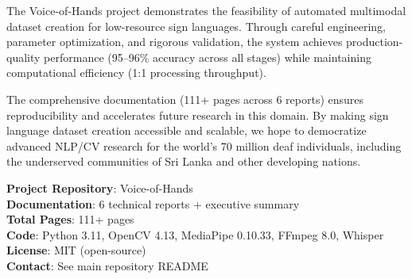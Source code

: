 \documentclass[11pt,a4paper]{article}
\begin{document}
The Voice-of-Hands project demonstrates the feasibility of automated multimodal dataset creation for low-resource sign languages. Through careful engineering, parameter optimization, and rigorous validation, the system achieves production-quality performance (95--96\% accuracy across all stages) while maintaining computational efficiency (1:1 processing throughput).

The comprehensive documentation (111+ pages across 6 reports) ensures reproducibility and accelerates future research in this domain. By making sign language dataset creation accessible and scalable, we hope to democratize advanced NLP/CV research for the world's 70 million deaf individuals, including the underserved communities of Sri Lanka and other developing nations.

\vspace{1cm}

\textbf{Project Repository}: Voice-of-Hands\\
\textbf{Documentation}: 6 technical reports + executive summary\\
\textbf{Total Pages}: 111+ pages\\
\textbf{Code}: Python 3.11, OpenCV 4.13, MediaPipe 0.10.33, FFmpeg 8.0, Whisper\\
\textbf{License}: MIT (open-source)\\
\textbf{Contact}: See main repository README
\end{document}
